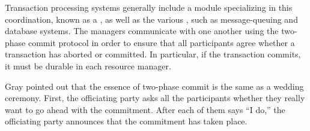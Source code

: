 Transaction processing systems generally
include a module specializing in this coordination, known as a , as well as the various
, such as message-queuing and database
systems.  The managers communicate with one another using the two-phase
commit protocol
in order to ensure that all
participants agree whether a transaction has aborted or committed.  In
particular, if the transaction commits, it must be durable in each
resource manager.

Gray pointed out that the essence of two-phase commit is
the same as a wedding ceremony.  First, the officiating party asks all
the participants whether they really want to go ahead with the
commitment.  After each of them says ``I do,'' the officiating party
announces that the commitment has taken place.

